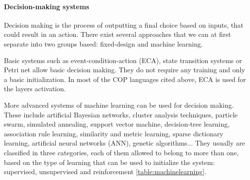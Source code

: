 \documentclass[a4paper]{article}
\begin{document}
\paragraph{Decision-making systems}
Decision making is the process of outputting a final choice based on inputs, that could result in an action. There exist several approaches that we can at first separate into two groups based: fixed-design and machine learning.

Basic systems such as event-condition-action (ECA), state transition systems or Petri net allow basic decision making. They do not require any training and only a basic initialization. In most of the COP languages cited above, ECA is used for the layers activation.

More advanced systems of machine learning can be used for decision making. These include artificial Bayesian networks, cluster analysis techniques, particle swarm, simulated annealing, support vector machine, decision-tree learning, association rule learning, similarity and metric learning, sparse dictionary learning, artificial neural networks (ANN), genetic algorithms... They usually are classified in three categories, each of them allowed to belong to more than one, based on the type of learning that can be used to initialize the system: supervised, unsupervised and reinforcement \ref{table:machinelearning}.
\end{document}
